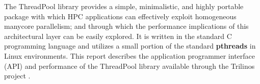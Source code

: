 The ThreadPool library provides a simple, minimalistic, and highly portable package with which HPC applications can effectively exploit homogeneous manycore parallelism; and through which the performance implications of this architectural layer can be easily explored.
%
It is written in the standard C programming language and utilizes a small portion of the standard \textbf{pthreads} \cite{pthreads:Standard} in Linux environments.
%
This report describes the application programmer interface (API) and performance of the ThreadPool library available through the Trilinos project \cite{Trilinos:WebSite}.


